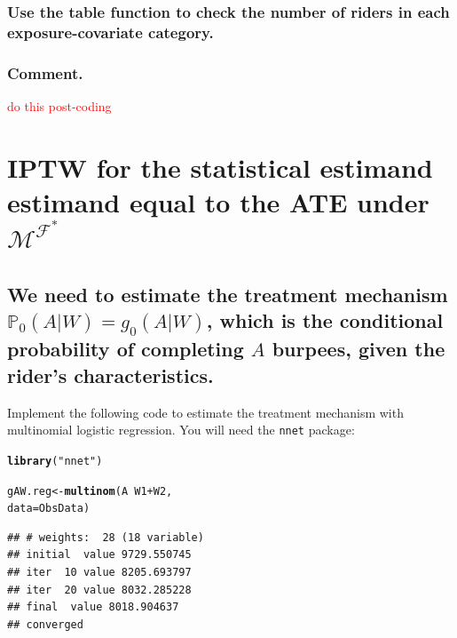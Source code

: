 \documentclass{article}\usepackage[]{graphicx}\usepackage[]{xcolor}
\makeatletter
\newcommand{\hlstr}[1]{\textcolor[rgb]{0.192,0.494,0.8}{#1}}%
\newcommand{\hlopt}[1]{\textcolor[rgb]{0,0,0}{#1}}%
\newcommand{\hlstd}[1]{\textcolor[rgb]{0.345,0.345,0.345}{#1}}%
\newcommand{\hlkwb}[1]{\textcolor[rgb]{0.69,0.353,0.396}{#1}}%
\newcommand{\hlkwc}[1]{\textcolor[rgb]{0.333,0.667,0.333}{#1}}%
\newcommand{\hlkwd}[1]{\textcolor[rgb]{0.737,0.353,0.396}{\textbf{#1}}}%
\newenvironment{kframe}{%
 \def\at@end@of@kframe{}%
 \ifinner\ifhmode%
  \def\at@end@of@kframe{\end{minipage}}%
  \begin{minipage}{\columnwidth}%
 \fi\fi%
 \def\FrameCommand##1{\hskip\@totalleftmargin \hskip-\fboxsep
 \colorbox{shadecolor}{##1}\hskip-\fboxsep
     \hskip-\linewidth \hskip-\@totalleftmargin \hskip\columnwidth}%
 \MakeFramed {\advance\hsize-\width
   \@totalleftmargin\z@ \linewidth\hsize
   \@setminipage}}%
 {\par\unskip\endMakeFramed%
 \at@end@of@kframe}
\newenvironment{knitrout}{}{} %
\makeatother
\begin{document}
    \subsubsection{Use the table function to check the number of riders in each exposure-covariate category.}
    
    \subsubsection{Comment.}
    
    \textcolor{red}{do this post-coding}

\section{IPTW for the statistical estimand estimand equal to the ATE under $\mathcal{M}^{\mathcal{F}^*}$}

  \subsection{We need to estimate the treatment mechanism $\mathbb{P}_0(A|W) = g_0(A|W)$, which is the conditional probability of completing $A$ burpees, given the rider's characteristics.} 

Implement the following code to estimate the treatment mechanism with multinomial logistic regression. You will need the \texttt{nnet} package:

\begin{knitrout}
\color{fgcolor}\begin{kframe}
\begin{alltt}
\hlkwd{library}\hlstd{(}\hlstr{"nnet"}\hlstd{)}
\end{alltt}


{\ttfamily\noindent\color{warningcolor}{\#\# Warning: package 'nnet' was built under R version 3.6.3}}\begin{alltt}
\hlstd{gAW.reg} \hlkwb{<-} \hlkwd{multinom}\hlstd{(A} \hlopt{~} \hlstd{W1} \hlopt{+} \hlstd{W2,}
                    \hlkwc{data} \hlstd{= ObsData)}
\end{alltt}
\begin{verbatim}
## # weights:  28 (18 variable)
## initial  value 9729.550745 
## iter  10 value 8205.693797
## iter  20 value 8032.285228
## final  value 8018.904637 
## converged
\end{verbatim}
\end{kframe}
\end{knitrout}
  
\end{document}
